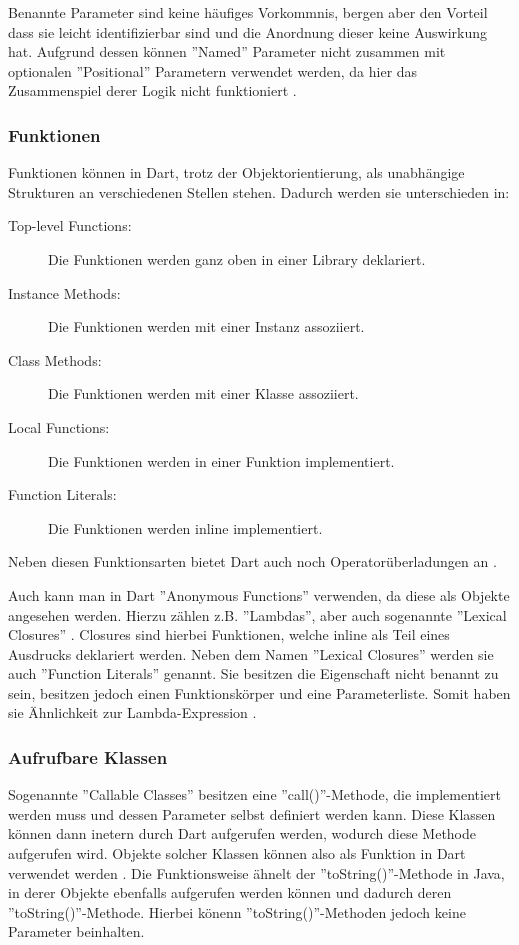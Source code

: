     \noindent
    Benannte Parameter sind keine häufiges Vorkommnis, bergen aber den Vorteil dass sie leicht identifizierbar sind und die Anordnung dieser keine Auswirkung hat. Aufgrund dessen können ''Named'' Parameter nicht zusammen mit optionalen ''Positional'' Parametern verwendet werden, da hier das Zusammenspiel derer Logik nicht funktioniert \cite{book:Dart:DPL_GiladBracha}.

    \subsubsection{Funktionen}
    \label{subsubsec:Dart:Klassen:AnonymousFunc}
    Funktionen können in Dart, trotz der Objektorientierung, als unabhängige Strukturen an verschiedenen Stellen stehen. Dadurch werden sie unterschieden in:
        \begin{description}
            \item[Top-level Functions:] Die Funktionen werden ganz oben in einer Library deklariert.
            \item[Instance Methods:] Die Funktionen werden mit einer Instanz assoziiert.
            \item[Class Methods:] Die Funktionen werden mit einer Klasse assoziiert.
            \item[Local Functions:] Die Funktionen werden in einer Funktion implementiert.
            \item[Function Literals:] Die Funktionen werden inline implementiert.
        \end{description}
    Neben diesen Funktionsarten bietet Dart auch noch Operatorüberladungen an \cite{book:Dart:DPL_GiladBracha}.
    
    \noindent
    Auch kann man in Dart ''Anonymous Functions'' verwenden, da diese als Objekte angesehen werden. Hierzu zählen z.B. ''Lambdas'', aber auch sogenannte ''Lexical Closures'' \cite{book:Dart:StartGuideDart_SanjibSinha}.
    Closures sind hierbei Funktionen, welche inline als Teil eines Ausdrucks deklariert werden. Neben dem Namen ''Lexical Closures'' werden sie auch ''Function Literals'' genannt. Sie besitzen die Eigenschaft nicht benannt zu sein, besitzen jedoch einen Funktionskörper und eine Parameterliste. Somit haben sie Ähnlichkeit zur Lambda-Expression \cite{book:Dart:DPL_GiladBracha}.

    \subsubsection{Aufrufbare Klassen}
    \label{subsubsec:Dart:Klassen:CallClass}
    Sogenannte ''Callable Classes'' besitzen eine ''call()''-Methode, die implementiert werden muss und dessen Parameter selbst definiert werden kann.
    Diese Klassen können dann inetern durch Dart aufgerufen werden, wodurch diese Methode aufgerufen wird.
    Objekte solcher Klassen können also als Funktion in Dart verwendet werden \cite{book:Dart:StartGuideDart_SanjibSinha}.
    Die Funktionsweise ähnelt der ''toString()''-Methode in Java, in derer Objekte ebenfalls aufgerufen werden können und dadurch deren ''toString()''-Methode. Hierbei könenn ''toString()''-Methoden jedoch keine Parameter beinhalten.

